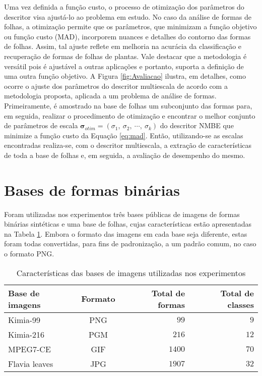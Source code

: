 Uma vez definida a função custo, o processo de otimização dos parâmetros do descritor visa ajustá-lo ao problema em estudo. No caso da análise de formas de folhas, a otimização permite que os parâmetros, que minimizam a função objetivo ou função custo (\ac{MAD}), incorporem nuances e detalhes do contorno das formas de folhas. Assim, tal ajuste reflete em melhoria na acurácia da classificação e recuperação de formas de folhas de plantas. Vale destacar que a metodologia é versátil pois é ajustável a outras aplicações e portanto, suporta a definição de uma outra função objetivo. A Figura  \ref{fig:Avaliacao} ilustra, em detalhes, como ocorre o ajuste dos parâmetros do descritor multiescala de acordo com a metodologia proposta, aplicada a um problema de análise de formas. Primeiramente, é amostrado na base de folhas um subconjunto das formas para, em seguida, realizar o procedimento de otimização e encontrar o melhor conjunto de parâmetros de escala  $\boldsymbol{\sigma}_{otim} = (\sigma_1,\:\sigma_2,\:\cdots,\:\sigma_k)$ do descritor \ac{NMBE} que minimize a função custo da Equação \ref{eq:mad}. Então, utilizando-se as escalas encontradas realiza-se, com o descritor multiescala, a extração de características de toda a base de folhas e, em seguida, a avaliação de desempenho do mesmo.

\section{Bases de formas binárias}

Foram utilizadas nos experimentos três bases públicas de imagens de formas binárias sintéticas e uma base de folhas, cujas características estão apresentadas na Tabela \ref{tbl:bases}. Embora o formato das imagens em cada base seja diferente, estas foram todas convertidas, para fins de padronização, a um padrão comum, no caso o formato PNG. 

\begin{table}[b]
	\centering
	\caption{Características das bases de imagens utilizadas nos experimentos}
	\label{tbl:bases}
	\begin{tabular}{lcrr}
		\toprule
		Base de imagens       & Formato & Total de formas & Total de classes \\
		\midrule
		Kimia-99      & PNG & $99$   & $9$     \\
		Kimia-216     & PGM & $216$  & $12$    \\
		MPEG7-CE      & GIF & $1400$ & $70$    \\
		Flavia leaves & JPG & $1907$ & $32$\\
		\bottomrule
	\end{tabular}
\end{table}

